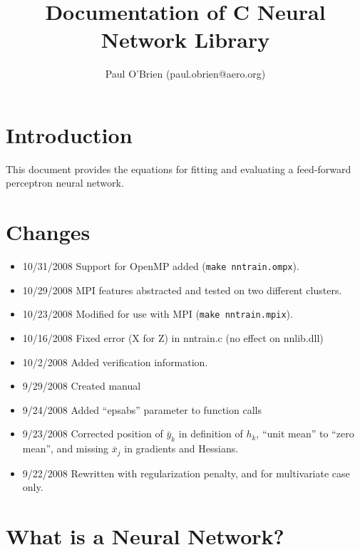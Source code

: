 \documentclass{article}    %
\title{Documentation of C Neural Network Library}
\author{Paul O'Brien (paul.obrien@aero.org)}         %
\begin{document}

\maketitle                 %

\tableofcontents

\section{Introduction}

This document provides the equations for fitting and evaluating a
feed-forward perceptron neural network.

\section{Changes}

\begin{itemize}
\item{10/31/2008} Support for OpenMP added (\verb|make nntrain.ompx|).
\item{10/29/2008} MPI features abstracted and tested on two different clusters.
\item{10/23/2008} Modified for use with MPI (\verb|make nntrain.mpix|).
\item{10/16/2008} Fixed error (X for Z) in nntrain.c (no effect on nnlib.dll)
\item{10/2/2008} Added verification information.
\item{9/29/2008} Created manual
\item{9/24/2008} Added ``epsabs'' parameter to function calls
\item{9/23/2008} Corrected position of $\bar{y}_k$ in definition of
  $h_k$, ``unit mean'' to ``zero mean'', and missing $\bar{x}_{j}$ in
  gradients and Hessians.
\item{9/22/2008} Rewritten with regularization penalty, and for multivariate case only.
\end{itemize}

\section{What is a Neural Network?}
\end{document}
